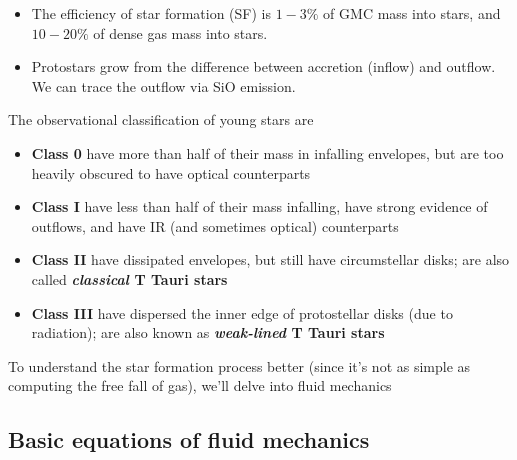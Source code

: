 \documentclass{tufte-handout}
\renewcommand{\textbf}[1]{{\bf \textcolor{dark-gray}{#1}}}
\begin{document}
\begin{itemize}
\begin{marginfigure}
\caption{A few forms of the initial mass function (Draine Figure 42.1).}
\end{marginfigure}
\item[] The efficiency of star formation (SF) is $1-3\%$ of GMC mass into stars, and $10-20\%$ of dense gas mass into stars.
\item[] Protostars grow from the difference between accretion (inflow) and outflow. We can trace the outflow via SiO emission.
\end{itemize}

The observational classification of young stars are
\begin{itemize}
\item[] \textbf{Class 0} have more than half of their mass in infalling envelopes, but are too heavily obscured to have optical counterparts
\item[] \textbf{Class I} have less than half of their mass infalling, have strong evidence of outflows, and have IR (and sometimes optical) counterparts
\item[] \textbf{Class II} have dissipated envelopes, but still have circumstellar disks; are also called \textbf{\textit{classical} T Tauri stars}
\item[] \textbf{Class III} have dispersed the inner edge of protostellar disks (due to radiation); are also known as \textbf{\textit{weak-lined} T Tauri stars}
\end{itemize}

To understand the star formation process better (since it's not as simple as computing the free fall of gas), we'll delve into fluid mechanics
\subsection{Basic equations of fluid mechanics}
\end{document}
